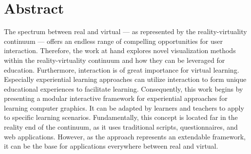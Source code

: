 %





\chapter*{Abstract}
\label{sec:abstract}
\vspace*{-10mm}

The spectrum between real and virtual --- as represented by the reality-virtuality continuum --- offers an endless range of compelling opportunities for user interaction. Therefore, the work at hand explores novel visualization methods within the reality-virtuality continuum and how they can be leveraged for education.
Furthermore, interaction is of great importance for virtual learning. Especially experiential learning approaches can utilize interaction to form unique educational experiences to facilitate learning.
Consequently, this work begins by presenting a modular interactive framework for experiential approaches for learning computer graphics. It can be adapted by learners and teachers to apply to specific learning scenarios. Fundamentally, this concept is located far in the reality end of the continuum, as it uses traditional scripts, questionnaires, and web applications. However, as the approach represents an extendable framework, it can be the base for applications everywhere between real and virtual.

